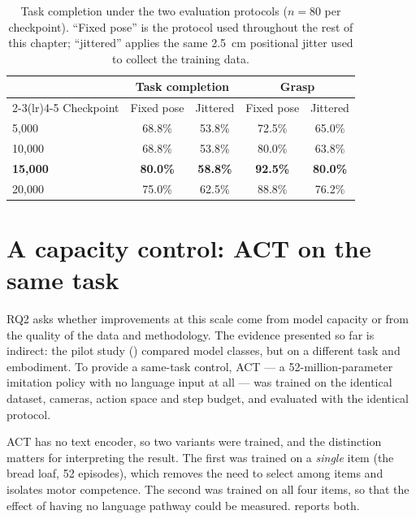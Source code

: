 \begin{table}[ht]
\caption{Task completion under the two evaluation protocols ($n=80$ per checkpoint).
``Fixed pose'' is the protocol used throughout the rest of this chapter; ``jittered''
applies the same \SI{2.5}{cm} positional jitter used to collect the training data.}
\begin{center}
\begin{tabular}{lcccc}
\toprule
& \multicolumn{2}{c}{Task completion} & \multicolumn{2}{c}{Grasp} \\
\cmidrule(lr){2-3}\cmidrule(lr){4-5}
Checkpoint & Fixed pose & Jittered & Fixed pose & Jittered \\
\midrule
5{,}000  & 68.8\% & 53.8\% & 72.5\% & 65.0\% \\
10{,}000 & 68.8\% & 53.8\% & 80.0\% & 63.8\% \\
\textbf{15{,}000} & \textbf{80.0\%} & \textbf{58.8\%} & \textbf{92.5\%} & \textbf{80.0\%} \\
20{,}000 & 75.0\% & 62.5\% & 88.8\% & 76.2\% \\
\bottomrule
\end{tabular}
\end{center}
\label{tab:robustness}
\end{table}

\section{A capacity control: ACT on the same task}
\label{sec:results-act}
RQ2 asks whether improvements at this scale come from model capacity or from the
quality of the data and methodology. The evidence presented so far is indirect: the
pilot study () compared model classes, but on a different
task and embodiment. To provide a same-task control, ACT
\parencite{zhao2023act} --- a 52-million-parameter imitation policy with no language
input at all --- was trained on the identical dataset, cameras, action space and step
budget, and evaluated with the identical protocol.

ACT has no text encoder, so two variants were trained, and the distinction matters for
interpreting the result. The first was trained on a \emph{single} item (the bread
loaf, 52 episodes), which removes the need to select among items and isolates motor
competence. The second was trained on all four items, so that the effect of having no
language pathway could be measured.  reports both.

